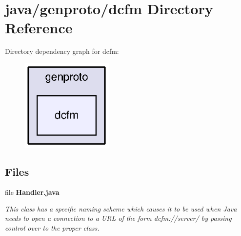 \section{java/genproto/dcfm Directory Reference}
\label{dir_625eb7975d706d6838cdaf30eed55f4a}
Directory dependency graph for dcfm\+:
\nopagebreak
\begin{figure}[H]
\begin{center}
\leavevmode
\includegraphics[width=130pt]{dir_625eb7975d706d6838cdaf30eed55f4a_dep}
\end{center}
\end{figure}
\subsection*{Files}
\begin{DoxyCompactItemize}
\item 
file {\bf Handler.\+java}
\begin{DoxyCompactList}\small\item\em This class has a specific naming scheme which causes it to be used when Java needs to open a connection to a U\+R\+L of the form dcfm\+://server/ by passing control over to the proper class. \end{DoxyCompactList}\end{DoxyCompactItemize}
